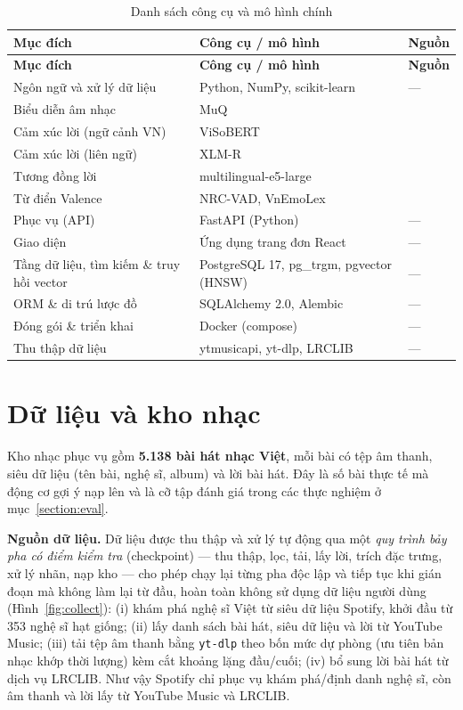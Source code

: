 \documentclass[../DoAn.tex]{subfiles}
\begin{document}
\begin{longtable}{|p{4.2cm}|p{4.0cm}|p{3.2cm}|}
\caption{Danh sách công cụ và mô hình chính}\label{table:tools}\\
\hline
\textbf{Mục đích} & \textbf{Công cụ / mô hình} & \textbf{Nguồn} \\
\hline
\endfirsthead
\hline
\textbf{Mục đích} & \textbf{Công cụ / mô hình} & \textbf{Nguồn} \\
\hline
\endhead
Ngôn ngữ và xử lý dữ liệu & Python, NumPy, scikit-learn & --- \\
\hline
Biểu diễn âm nhạc & MuQ & \cite{zhu2025muq} \\
\hline
Cảm xúc lời (ngữ cảnh VN) & ViSoBERT & \cite{nguyen2023visobert} \\
\hline
Cảm xúc lời (liên ngữ) & XLM-R & \cite{conneau2020xlmr} \\
\hline
Tương đồng lời & multilingual-e5-large & \cite{wang2024e5} \\
\hline
Từ điển Valence & NRC-VAD, VnEmoLex & \cite{mohammad2018nrcvad, doan2022vnemolex} \\
\hline
Phục vụ (API) & FastAPI (Python) & --- \\
\hline
Giao diện & Ứng dụng trang đơn React & --- \\
\hline
Tầng dữ liệu, tìm kiếm \& truy hồi vector & PostgreSQL 17, pg\_trgm, pgvector (HNSW) & --- \\
\hline
ORM \& di trú lược đồ & SQLAlchemy 2.0, Alembic & --- \\
\hline
Đóng gói \& triển khai & Docker (compose) & --- \\
\hline
Thu thập dữ liệu & ytmusicapi, yt-dlp, LRCLIB & --- \\
\hline
\end{longtable}

\section{Dữ liệu và kho nhạc}
\label{section:data}
Kho nhạc phục vụ gồm \textbf{5.138 bài hát nhạc Việt}, mỗi bài có tệp âm thanh, siêu dữ liệu (tên bài, nghệ sĩ, album) và lời bài hát. Đây là số bài thực tế mà động cơ gợi ý nạp lên và là cỡ tập đánh giá trong các thực nghiệm ở mục~\ref{section:eval}.

\textbf{Nguồn dữ liệu.} Dữ liệu được thu thập và xử lý tự động qua một \textit{quy trình bảy pha có điểm kiểm tra} (checkpoint) --- thu thập, lọc, tải, lấy lời, trích đặc trưng, xử lý nhãn, nạp kho --- cho phép chạy lại từng pha độc lập và tiếp tục khi gián đoạn mà không làm lại từ đầu, hoàn toàn không sử dụng dữ liệu người dùng (Hình~\ref{fig:collect}): (i) khám phá nghệ sĩ Việt từ siêu dữ liệu Spotify, khởi đầu từ 353 nghệ sĩ hạt giống; (ii) lấy danh sách bài hát, siêu dữ liệu và lời từ YouTube Music; (iii) tải tệp âm thanh bằng \texttt{yt-dlp} theo bốn mức dự phòng (ưu tiên bản nhạc khớp thời lượng) kèm cắt khoảng lặng đầu/cuối; (iv) bổ sung lời bài hát từ dịch vụ LRCLIB. Như vậy Spotify chỉ phục vụ khám phá/định danh nghệ sĩ, còn âm thanh và lời lấy từ YouTube Music và LRCLIB.
\end{document}
